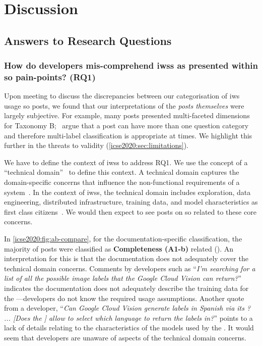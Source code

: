 \section{Discussion}
\label{icse2020:sec:discussion}

%

%

\subsection{Answers to Research Questions}


\subsubsection{How do developers mis-comprehend \glspl{iws} as presented within \gls{so} pain-points? (RQ1)}
%
Upon meeting to discuss the discrepancies between our categorisation of \gls{iws} usage \gls{so} posts, we found that our interpretations of the \textit{posts themselves} were largely subjective. For example, many posts presented multi-faceted dimensions for Taxonomy B;~\citet{Beyer:2018fm} argue that a post can have more than one question category and therefore multi-label classification is appropriate at times. We highlight this further in the threats to validity (\cref{icse2020:sec:limitations}).

We have to define the context of \glspl{iws} to address RQ1. We use the concept of a ``technical domain''~\citep{Barnett:2018Kx} to define this context. A technical domain captures the domain-specific concerns that influence the non-functional requirements of a system~\citep{Barnett:2018Kx}. In the context of \glspl{iws}, the technical domain includes exploration, data engineering, distributed infrastructure, training data, and model characteristics as first class citizens~\citep{Barnett:2018Kx}. We would then expect to see posts on \gls{so} related to these core concerns.

In \cref{icse2020:fig:ab-compare}, for the documentation-specific classification, the majority of posts were classified as \textbf{Completeness (A1-b)} related (\PctTaxACompleteness{}). An interpretation for this is that the documentation does not adequately cover the technical domain concerns. Comments by developers such as ``\textit{I'm searching for a list of all the possible image labels that the Google Cloud Vision  can return?}'' indicates the documentation does not adequately describe the training data for the ---developers do not know the required usage assumptions. Another quote from a developer, ``\textit{Can Google Cloud Vision generate labels in Spanish via its ? ... [Does the ] allow to select which language to return the labels in?}'' points to a lack of details relating to the characteristics of the models used by the . It would seem that developers are unaware of aspects of the technical domain concerns.%

